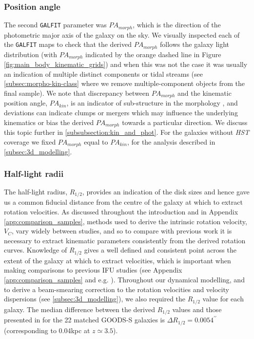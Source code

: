 \documentclass[fleqn,usenatbib]{mnras}
\begin{document}
\subsubsection{Position angle}\label{subsubsection:position_angle}
The second {\tt GALFIT} parameter was $PA_{morph}$, which is the direction of the photometric major axis of the galaxy on the sky.
We visually inspected each of the {\tt GALFIT} maps to check that the derived $PA_{morph}$ follows the galaxy light distribution (with $PA_{morph}$ indicated by the orange dashed line in Figure \ref{fig:main_body_kinematic_grids}) and when this was not the case it was usually an indication of multiple distinct components or tidal streams (see \cref{subsec:morpho-kin-class} where we remove multiple-component objects from the final sample).
We note that discrepancy between $PA_{morph}$ and the kinematic position angle, $PA_{kin}$, is an indicator of sub-structure in the morphology \citep[e.g.][]{Queyrel2012,Wisnioski2015,Rodrigues2017}, and deviations can indicate clumps or mergers which may influence the underlying kinematics or bias the derived $PA_{morph}$ towards a particular direction.
We discuss this topic further in \cref{subsubsection:kin_and_phot}.
For the galaxies without {\em HST} coverage we fixed $PA_{morph}$ equal to $PA_{kin}$, for the analysis described in \cref{subsec:3d_modelling}.


\subsubsection{Half-light radii}\label{subsubsection:half-light_radii}
The half-light radius, $R_{1/2}$, provides an indication of the disk sizes and hence gave us a common fiducial distance from the centre of the galaxy at which to extract rotation velocities.
As discussed throughout the introduction and in Appendix \ref{app:comparison_samples}, methods used to derive the intrinsic rotation velocity, $V_{C}$, vary widely between studies, and so to compare with previous work it is necessary to extract kinematic parameters consistently from the derived rotation curves.
Knowledge of $R_{1/2}$ gives a well defined and consistent point across the extent of the galaxy at which to extract velocities, which is important when making comparisons to previous IFU studies (see Appendix \ref{app:comparison_samples} and e.g. \citealt{ForsterSchreiber2009,Epinat2012,Wisnioski2015,Stott2016,Harrison2017,Swinbank2017}).
Throughout our dynamical modelling, and to derive a beam-smearing correction to the rotation velocities and velocity dispersions (see \cref{subsec:3d_modelling}), we also required the $R_{1/2}$ value for each galaxy.
The median difference between the derived $R_{1/2}$ values and those presented in \cite{VanderWel2012} for the 22 matched GOODS-S galaxies is $\Delta R_{1/2} = 0.0054^{\prime\prime}$ (corresponding to 0.04kpc at $z\simeq3.5$). \\
\end{document}

